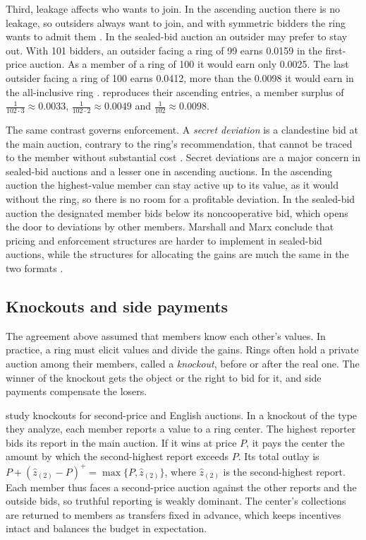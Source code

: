 Third, leakage affects who wants to join. In the ascending auction there is no leakage, so outsiders
always want to join, and with symmetric bidders the ring wants to admit them
\citep[p.~177]{MarshallMarx2012}. In the sealed-bid auction an outsider may prefer to stay out. With
101 bidders, an outsider facing a ring of 99 earns 0.0159 in the first-price auction. As a member of a
ring of 100 it would earn only 0.0025. The last outsider facing a ring of 100 earns 0.0412, more than
the 0.0098 it would earn in the all-inclusive ring \citep[Table~8.2, pp.~185--186]{MarshallMarx2012}.
 reproduces their ascending entries, a member surplus of $\frac{1}{102\cdot
3}\approx 0.0033$, $\frac{1}{102\cdot 2}\approx 0.0049$ and $\frac{1}{102}\approx 0.0098$.

The same contrast governs enforcement. A \emph{secret deviation} is a clandestine bid at the main
auction, contrary to the ring's recommendation, that cannot be traced to the member without
substantial cost \citep[ch.~9, pp.~187--188]{MarshallMarx2012}. Secret deviations are a major concern
in sealed-bid auctions and a lesser one in ascending auctions. In the ascending auction the
highest-value member can stay active up to its value, as it would without the ring, so there is no
room for a profitable deviation. In the sealed-bid auction the designated member bids below its
noncooperative bid, which opens the door to deviations by other members. Marshall and Marx conclude
that pricing and enforcement structures are harder to implement in sealed-bid auctions, while the
structures for allocating the gains are much the same in the two formats \citep[p.~198]{MarshallMarx2012}.

\subsection{Knockouts and side payments}\label{sec:14-collusion-knockout}

The agreement above assumed that members know each other's values. In practice, a ring must elicit
values and divide the gains. Rings often hold a private auction among their members, called a
\emph{knockout}, before or after the real one. The winner of the knockout gets the object or the right to
bid for it, and side payments compensate the losers.

\citet{GrahamMarshall1987} study knockouts for second-price and English auctions.
In a knockout of the type they analyze, each member reports a value to a ring center. The highest
reporter bids its report in the main auction. If it wins at price $P$, it pays the center the amount
by which the second-highest report exceeds $P$. Its total outlay is
$P+(\hat z_{(2)}-P)^+=\max\{P,\hat z_{(2)}\}$, where $\hat z_{(2)}$ is the second-highest report. Each member thus
faces a second-price auction against the other reports and the outside bids, so truthful reporting is
weakly dominant. The center's collections are returned to members as transfers fixed in advance,
which keeps incentives intact and balances the budget in expectation.

